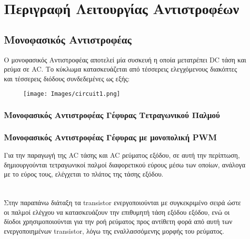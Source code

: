 \section{Περιγραφή Λειτουργίας Αντιστροφέων}

\subsection{Μονοφασικός Αντιστροφέας}
\noindent
Ο μονοφασικός Αντιστροφέας αποτελεί μία συσκευή η οποία μετατρέπει DC τάση και ρεύμα σε AC. Το κύκλωμα κατασκευάζεται από τέσσερεις ελεγχόμενους διακόπτες και τέσσερεις διόδους συνδεδεμένες ως εξής:
\begin{figure}[H]
	\centering
	\texttt{[image: Images/circuit1.png]}
	\label{circuit_1}
\end{figure}

\subsubsection{Μονοφασικός Αντιστροφέας Γέφυρας Τετραγωνικού Παλμού}
\subsubsection{Μονοφασικός Αντιστροφέας Γέφυρας με μονοπολική PWM}
\label{single_PWM}

\noindent
Για την παραγωγή της AC τάσης και AC ρεύματος εξόδου, σε αυτή την περίπτωση, δημιουργούνται τετραγωνικοί παλμοί διαφορετικού εύρους μέσω των οποίων, ανάλογα με το εύρος τους, ελέγχεται το πλάτος της τάσης εξόδου.
\noindent\\\\\\
Στην παραπάνω διάταξη τα transistor ενεργοποιούνται με συγκεκριμένο σειρά ώστε οι παλμοί ελέγχου να κατασκευάζουν την επιθυμητή τάση εξόδου εξόδου, ενώ οι δίοδοι χρησιμοποιούνται  για την ροή ρεύματος προς αντίθετη φορά από αυτή των ενεργοποιημένων transistor, λόγω της εναλλασσόμενης μορφής του ρεύματος.

